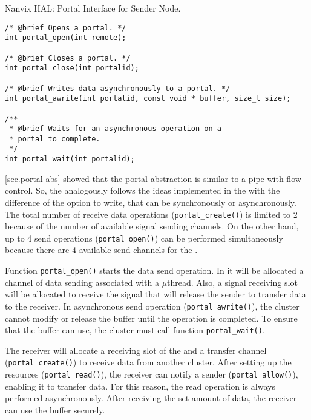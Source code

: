 \begin{listing}[!tb]
\caption{Nanvix HAL: Portal Interface for Sender Node.}
\label{code:hal-portal-sender}
\begin{verbatim}
/* @brief Opens a portal. */
int portal_open(int remote);

/* @brief Closes a portal. */
int portal_close(int portalid);

/* @brief Writes data asynchronously to a portal. */
int portal_awrite(int portalid, const void * buffer, size_t size);

/**
 * @brief Waits for an asynchronous operation on a
 * portal to complete.
 */
int portal_wait(int portalid);
\end{verbatim}
\end{listing}

				\autoref{sec.portal-abs} showed that the portal abstraction is similar to
				a \posix pipe with flow control.
				So, the \portal analogously follows the ideas implemented
				in the \mailbox with the difference of the option to write,
				that can be synchronously or asynchronously.
				The total number of receive data operations (\texttt{portal\_create()})
				is limited to 2 because of the number of available signal sending channels.
				On the other hand, up to 4 send operations (\texttt{portal\_open()})
				can be performed simultaneously because there are 4 available send
				channels for the \portal.

				Function \texttt{portal\_open()} starts the data send operation.
				In it will be allocated a channel of data sending associated with
				a $\mu$thread.
				Also, a signal receiving slot will be allocated to receive the
				signal that will release the sender to transfer data to the receiver.
				In asynchronous send operation (\texttt{portal\_awrite()}), the cluster
				cannot modify or release the buffer until the operation is completed.
				To ensure that the buffer can use, the cluster must call function \texttt{portal\_wait()}.

				The receiver will allocate a receiving slot of the \dnoc and a transfer
				channel (\texttt{portal\_create()}) to receive data from another cluster.
				After setting up the resources (\texttt{portal\_read()}), the receiver
				can notify a sender (\texttt{portal\_allow()}), enabling it to transfer data.
				For this reason, the read operation is always performed asynchronously.
				After receiving the set amount of data, the receiver can use the buffer securely.

